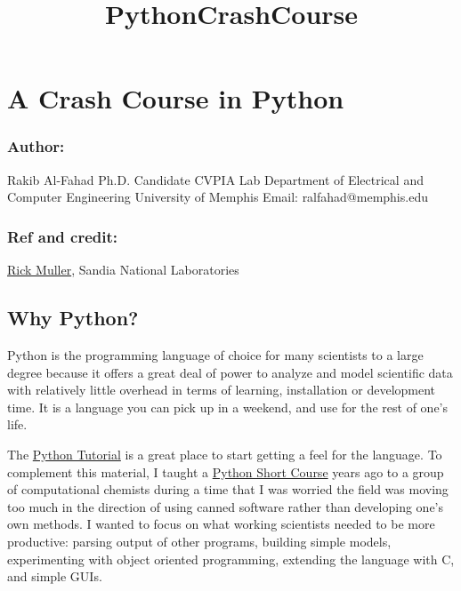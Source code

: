 \documentclass[11pt]{article}
\title{PythonCrashCourse}
\begin{document}
    
    
    \maketitle
    
    

    
    \section{A Crash Course in Python}\label{a-crash-course-in-python}

\subsubsection{Author:}\label{author}

Rakib Al-Fahad Ph.D. Candidate CVPIA Lab Department of Electrical and
Computer Engineering University of Memphis Email: ralfahad@memphis.edu

\subsubsection{Ref and credit:}\label{ref-and-credit}

\href{http://www.cs.sandia.gov/~rmuller/}{Rick Muller}, Sandia National
Laboratories

    \subsection{Why Python?}\label{why-python}

Python is the programming language of choice for many scientists to a
large degree because it offers a great deal of power to analyze and
model scientific data with relatively little overhead in terms of
learning, installation or development time. It is a language you can
pick up in a weekend, and use for the rest of one's life.

The \href{http://docs.python.org/2/tutorial/}{Python Tutorial} is a
great place to start getting a feel for the language. To complement this
material, I taught a
\href{http://www.wag.caltech.edu/home/rpm/python_course/}{Python Short
Course} years ago to a group of computational chemists during a time
that I was worried the field was moving too much in the direction of
using canned software rather than developing one's own methods. I wanted
to focus on what working scientists needed to be more productive:
parsing output of other programs, building simple models, experimenting
with object oriented programming, extending the language with C, and
simple GUIs.
\end{document}
